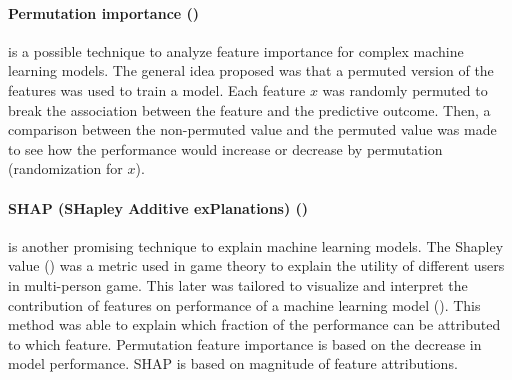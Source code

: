 \paragraph{Permutation importance (\cite{Altmann2010-lq})} is a possible technique to analyze feature importance for complex machine learning models. The general idea proposed was that a permuted version of the features was used to train a model. Each feature $x$ was randomly permuted to break the association between the feature and the predictive outcome. Then, a comparison between the non-permuted value and the permuted value was made to see how the performance would increase or decrease by permutation (randomization for $x$). 

\paragraph{SHAP (SHapley Additive exPlanations) (\cite{Lundberg2017-wo})} is another promising technique to explain machine learning models. The Shapley value (\cite{Shapley1953-cc}) was a metric used in game theory to explain the utility of different users in multi-person game. This later was tailored to visualize and interpret the contribution of features on performance of a machine learning model (\cite{Lundberg2017-wo}). This method was able to explain which fraction of the performance can be attributed to which feature. 
Permutation feature importance is based on the decrease in model performance. SHAP is based on magnitude of feature attributions.